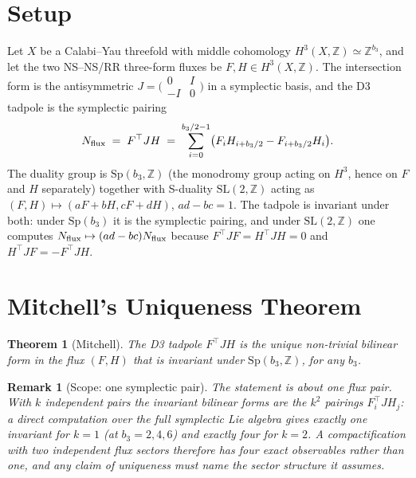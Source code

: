 \documentclass[11pt]{article}
\newtheorem{theorem}{Theorem}
\newtheorem{remark}{Remark}
\newcommand{\bthree}{b_3}
\newcommand{\flux}{F}
\newcommand{\hh}{H}
\begin{document}
\section{Setup}

Let $X$ be a Calabi--Yau threefold with middle cohomology $H^3(X,\mathbb{Z})\simeq
\mathbb{Z}^{\bthree}$, and let the two NS--NS/RR three-form fluxes be
$\flux,\hh\in H^3(X,\mathbb{Z})$. The intersection form is the antisymmetric
$J=\bigl(\begin{smallmatrix}0&I\\-I&0\end{smallmatrix}\bigr)$ in a symplectic basis,
and the D3 tadpole is the symplectic pairing
\begin{equation}
N_{\rm flux} \;=\; \flux^\top J \hh \;=\; \sum_{i=0}^{\bthree/2-1}\bigl(F_i H_{i+\bthree/2}-F_{i+\bthree/2}H_i\bigr).
\end{equation}
The duality group is $\mathrm{Sp}(\bthree,\mathbb{Z})$ (the monodromy group acting
on $H^3$, hence on $\flux$ and $\hh$ separately) together with S-duality
$\mathrm{SL}(2,\mathbb{Z})$ acting as $(\flux,\hh)\mapsto(a\flux+b\hh,c\flux+d\hh)$,
$ad-bc=1$. The tadpole is invariant under both: under $\mathrm{Sp}(\bthree)$ it is
the symplectic pairing, and under $\mathrm{SL}(2,\mathbb{Z})$ one computes
$N_{\rm flux}\mapsto(ad-bc)N_{\rm flux}$ because $\flux^\top J\flux=\hh^\top J\hh=0$
and $\hh^\top J\flux=-\flux^\top J\hh$.

\section{Mitchell's Uniqueness Theorem}

\begin{theorem}[Mitchell]
The D3 tadpole $\flux^\top J\hh$ is the unique non-trivial bilinear form in the flux
$(\flux,\hh)$ that is invariant under $\mathrm{Sp}(\bthree,\mathbb{Z})$, for any
$\bthree$.
\end{theorem}

\begin{remark}[Scope: one symplectic pair]
The statement is about \emph{one} flux pair. With $k$ independent pairs the invariant bilinear
forms are the $k^2$ pairings $\flux_i^\top J \hh_j$: a direct computation over the full symplectic
Lie algebra gives exactly one invariant for $k=1$ (at $\bthree = 2, 4, 6$) and exactly four for
$k=2$. A compactification with two independent flux sectors therefore has four exact observables
rather than one, and any claim of uniqueness must name the sector structure it assumes.
\end{remark}
\end{document}
